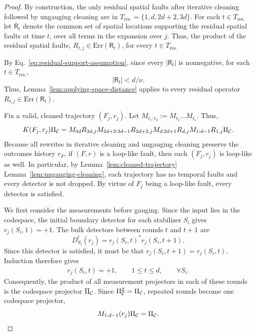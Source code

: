 \documentclass[11pt]{article}
\begin{document}
\begin{proof}

    By construction, the only residual spatial faults after iterative cleaning followed by ungauging cleaning are in $T_{\mathrm{res.}} = \{1, d, 2d+2, 3d\}$. 
    For each $t\in T_{\mathrm{res.}}$ let $\mathsf{R}_t$ denote the common set of spatial locations supporting the residual spatial faults at time $t$, over all terms in the expansion over $j$.
    Thus, the product of the residual spatial faults, $R_{t,j}\in \mathrm{Err}(\mathsf{R}_t)$, for every $t\in T_{\mathrm{res.}}$

    By Eq.~\eqref{eq:residual-support-assumption}, 
    since every $|\mathsf{R}_t|$ is nonnegative, for each $t\in T_{\mathrm{res.}}$, 
    \[
    |\mathsf{R}_t|<d/\nu.
    \]
    Thus, Lemma~\ref{lem:applying-space-distance} applies to every residual operator $R_{t,j}\in \mathrm{Err}(\mathsf{R}_t)$.

    Fix a valid, cleaned trajectory $(F_j,r_j)$. 
    Let $M_{t_1:t_2} := M_{t_2} \dots M_{t_1}$.
    Thus, 
    \[
    K(F_j,r_j)\Pi_{\mathcal{C}} =  M_{3d}
    R_{3d,j}
    M_{2d+2:3d-1}
    R_{2d+2,j}
    M_{d:2d+1}
    R_{d,j}
    M_{1:d-1}
    R_{1,j}\Pi_{\mathcal{C}}.
    \]
    Because all rewrites in iterative cleaning and ungauging cleaning preserve the outcomes history $r_F$, if $(F,r)$ is a loop-like fault, then each $(F_j,r_j)$ is loop-like as well.
    In particular, by Lemma~\ref{lem:cleaned-trajectory} Lemma~\ref{lem:ungauging-cleaning}, each trajectory has no temporal faults and every detector is not dropped. By virtue of $F_j$ being a loop-like fault, every detector is satisfied. 

    We first consider the measurements before gauging. Since the input lies in the codespace, the initial boundary detector for each stabilizer $S_i$ gives $r_j(S_i,1) = +1$.
    The bulk detectors between rounds $t$ and $t+1$ are 
    \[
    D_{S_i}^t (r_j) = r_j(S_i,t)^* r_{j}(S_i,t+1).
    \]
    Since this detector is satisfied, it must be that $r_j(S_i,t+1) = r_j(S_i,t)$. Induction therefore gives
    \begin{align}
        r_j(S_i,t) = +1,\qquad 1\le t\le d,\qquad \forall S_i.
        \label{eq:all-plus-one-stabilizers}
    \end{align}
    Consequently, the product of all measurement projectors in each of these rounds is the codespace projector $\Pi_{\mathcal{C}}$. 
    Since $\Pi_{\mathcal{C}}^2 = \Pi_{\mathcal{C}}$, repeated rounds become one codespace projector, 
    \[
    M_{1:d-1}(r_j) \Pi_{\mathcal{C}} = \Pi_{\mathcal{C}}.
    \]


\end{proof}
\end{document}
